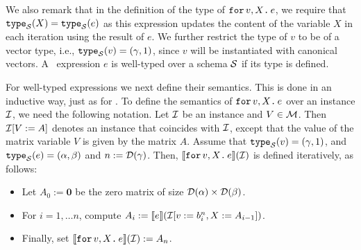 %
We also remark that in the definition of the type of $\texttt{for}\, v,X \texttt{.}\, e$, we require that $\texttt{type}_{\mathcal{S}}(X) = \texttt{type}_{\mathcal{S}}(e)$ as this expression updates the content of the variable $X$ in each iteration using the result of $e$. We further restrict the type of 
$v$ to be of a vector type, i.e., $\texttt{type}_{\mathcal{S}}(v)=(\gamma,1)$, since $v$ will be instantiated with canonical vectors.
%
A \langfor\ expression $e$ is well-typed over a schema $\mathcal{S}$ if its type is defined. 

For well-typed expressions we next define their semantics. This is done in an inductive way, just as for \lang. To define the semantics of $\texttt{for}\, v,X \texttt{.}\, e$ over an instance $\mathcal{I}$, we need the following notation. Let $\mathcal{I}$ be an instance and $V\in \mathcal{M}$. Then $\mathcal{I}[V := A]$ denotes an instance that coincides with $\mathcal{I}$, except that the value of the matrix variable $V$ is given by the matrix $A$. Assume that
$\texttt{type}_{\mathcal{S}}(v)= (\gamma,1)$, and $\texttt{type}_{\mathcal{S}}(e) = (\alpha,\beta)$ and $n := \mathcal{D}(\gamma)$. Then, $\llbracket \texttt{for}\, v,X \texttt{.}\, e \rrbracket(\mathcal{I})$ is defined iteratively, as follows:
\begin{itemize}
\item Let $A_0 := \mathbf{0}$ be the zero matrix of size $\mathcal{D}(\alpha)\times \mathcal{D}(\beta)$.
\item For $i=1,\ldots n$, compute $A_i:= \llbracket e \rrbracket(\mathcal{I}[v := b^{n}_i, X:= A_{i-1}])$.
\item Finally, set $\llbracket \texttt{for}\, v,X \texttt{.}\, e \rrbracket(\mathcal{I}):= A_{n}$.
\end{itemize}

